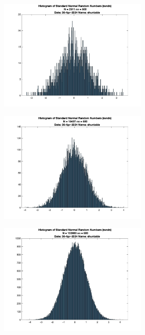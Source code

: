 \begin{figure}
    \centering
    \begin{subfigure}{0.48\linewidth}
        \centering
        \includegraphics[width=0.8\textwidth]{src/figures/standard-normal/randn_hist_N=2511_nn=500.jpg}
    \end{subfigure}
    \begin{subfigure}{0.48\linewidth}
        \centering
        \includegraphics[width=0.8\textwidth]{src/figures/standard-normal/randn_hist_N=15437_nn=500.jpg}
    \end{subfigure}
    \begin{subfigure}{0.48\linewidth}
        \centering
        \includegraphics[width=0.8\textwidth]{src/figures/standard-normal/randn_hist_N=133680_nn=500.jpg}

\end{subfigure}
\end{figure}
